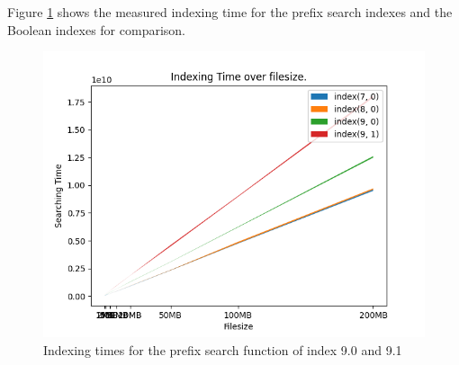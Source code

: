 Figure \ref{fig:IndexingBoolPrefi} shows the measured indexing time for the prefix search indexes and the Boolean indexes for comparison.

\begin{figure}[ht!]
    \centering
    \includegraphics[width=.8\textwidth]{LaTeX/Pictures/Results/Indexing[(7, 0), (8, 0), (9, 0), (9, 1)].png}
    \caption{Indexing times for the prefix search function of index 9.0 and 9.1}
    \label{fig:IndexingBoolPrefi}
\end{figure}

